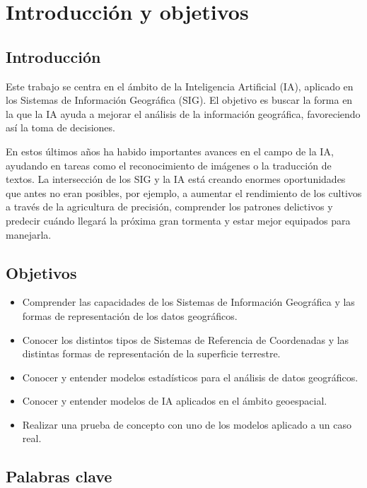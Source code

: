 \chapter*{Introducción y objetivos}
\setcounter{chapter}{1} 
\setcounter{section}{0}
\section{Introducción}
Este trabajo se centra en el ámbito de la Inteligencia Artificial (IA), aplicado en los Sistemas de Información Geográfica (SIG).
El objetivo es buscar la forma en la que la IA ayuda a mejorar el análisis de la información geográfica, favoreciendo así la toma de decisiones.

En estos últimos años ha habido importantes avances en el campo de la IA, ayudando en tareas como el reconocimiento de imágenes o la traducción de textos.
La intersección de los SIG y la IA está creando enormes oportunidades que antes no eran posibles, por ejemplo,
a aumentar el rendimiento de los cultivos a través de la agricultura de precisión,
comprender los patrones delictivos y predecir cuándo llegará la próxima gran tormenta y estar mejor equipados para manejarla.

\section{Objetivos}

\begin{itemize}
  \item Comprender las capacidades de los Sistemas de Información Geográfica y las formas de representación de los datos geográficos.
  \item Conocer los distintos tipos de Sistemas de Referencia de Coordenadas y las distintas formas de representación de la superficie terrestre.
  \item Conocer y entender modelos estadísticos para el análisis de datos geográficos.
  \item Conocer y entender modelos de IA aplicados en el ámbito geoespacial.
  \item Realizar una prueba de concepto con uno de los modelos aplicado a un caso real.
\end{itemize}

\section*{Palabras clave}


